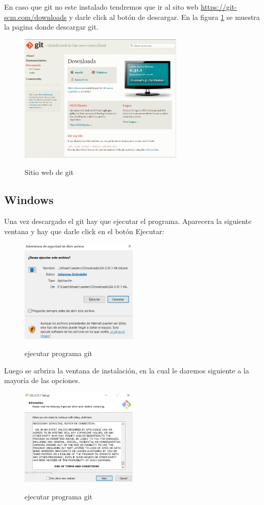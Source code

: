 \documentclass[11pt, oneside]{article}
\begin{document}
En caso que git no este instalado tendremos que ir al sito web \url{https://git-scm.com/downloads} y darle click al botón de descargar. En la figura \ref{fig:git-web} se muestra la pagina donde descargar git.
\begin{figure}[H]
  \centering
  \caption{Sitio web de git}
  \includegraphics[width=0.70\textwidth]{./img/ind-from-web.jpeg}
  \label{fig:git-web}
\end{figure}

\subsection{Windows}
Una vez descargado el git hay que ejecutar el programa. Aparecera la siguiente ventana y hay que darle click en el botón Ejecutar:
\begin{figure}[H]
  \centering
  \caption{ejecutar programa git}
  \includegraphics[width=0.50\textwidth]{./img/win/ins-win-1.jpeg}
  \label{fig:git-ins-1}
\end{figure}

Luego se arbrira la ventana de instalación, en la cual le daremos siguiente a la mayoría de las opciones.

\begin{figure}[H]
  \centering
  \caption{ejecutar programa git}
  \includegraphics[width=0.50\textwidth]{./img/win/ins-win-2.jpeg}
  \label{fig:git-ins-2}
\end{figure}
\end{document}
